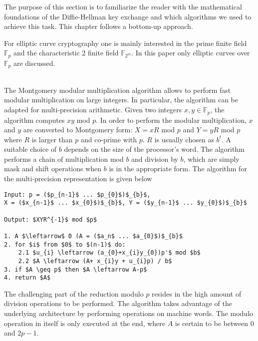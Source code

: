 The purpose of this section is to familiarize the reader with the mathematical foundations of the Diffie-Hellman key exchange and which algorithms we used to achieve this task. This chapter follows a bottom-up approach.

 For elliptic curve cryptography one is mainly interested in the prime finite field $\mathbb{F}_p$ and the characteristic 2 finite field $\mathbb{F}_{2^m}$. In this paper only elliptic curves over $\mathbb{F}_p$ are discussed.

\\The Montgomery modular multiplication algorithm allows to perform fast modular multiplication on large integers. In particular, the algorithm can be adapted for multi-precision arithmetic. Given two integers $x,y \in \mathbb{F}_p$, the algorithm computes $xy$ mod $p$. In order to perform the modular multiplication, $x$ and $y$ are converted to Montgomery form: $X = xR$ mod $p$ and $Y = yR$ mod $p$ where $R$ is larger than $p$ and co-prime with $p$. $R$ is usually chosen as $b^{t}$. A suitable choice of $b$ depends on the size of the processor's word. The algorithm performs a chain of multiplication mod $b$ and division by $b$, which are simply mask and shift operations when $b$ is in the appropriate form. The algorithm for the multi-precision representation is given below \cite[p. 602]{Menezes:1996}

\bigskip
\smallskip
\begin{lstlisting}[frame=single, mathescape=true, captionpos=b, caption=Mulitprecision Montogmery Modular Multiplication ]
Input: p = ($p_{n-1}$ ... $p_{0}$)$_{b}$,
X = ($x_{n-1}$ ... $x_{0}$)$_{b}$, Y = ($y_{n-1}$ ... $y_{0}$)$_{b}$

Output: $XYR^{-1}$ mod $p$

1. A $\leftarrow$ 0 (A = ($a_n$ ... $a_{0}$)$_{b}$
2. for $i$ from $0$ to $(n-1)$ do:
	2.1 $u_{i} \leftarrow (a_{0}+x_{i}y_{0})p'$ mod $b$
	2.2 $A \leftarrow (A+ x_{i}y + u_{i}p) / b$
3. if $A \geq p$ then $A \leftarrow A-p$
4. return $A$
\end{lstlisting}

The challenging part of the reduction modulo $p$ resides in the high amount of division operations to be performed. The algorithm takes advantage of the underlying architecture by performing operations on machine words. The modulo operation in itself is only executed at the end, where $A$ is certain to be between $0$ and $2p-1$.

